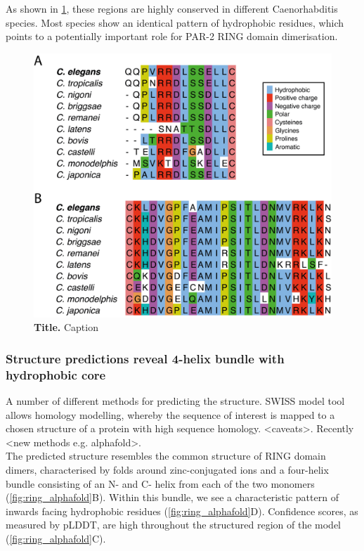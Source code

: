 \documentclass[12pt]{"article"}
\newcommand{\mycaption}[2]{\caption[#1]{\textbf{#1.} #2}}
\begin{document}
As shown in \cref{fig:alignments_par2}, these regions are highly conserved in different Caenorhabditis species. Most species show an identical pattern of hydrophobic residues, which points to a potentially important role for PAR-2 RING domain dimerisation. \\

\begin{figure}[!h]
\includegraphics[scale=1]{alignments_par2}
\setlength{\abovecaptionskip}{20pt}
\centering
\mycaption{Title}{Caption}
\label{fig:alignments_par2}
\end{figure}

\clearpage
\subsubsection{Structure predictions reveal 4-helix bundle with hydrophobic core}

A number of different methods for predicting the structure. SWISS model tool allows homology modelling, whereby the sequence of interest is mapped to a chosen structure of a protein with high sequence homology. <caveats>. Recently <new methods e.g. alphafold>. \citep{Jumper2021} \\

The predicted structure resembles the common structure of RING domain dimers, characterised by folds around zinc-conjugated ions and a four-helix bundle consisting of an N- and C- helix from each of the two monomers (\cref{fig:ring_alphafold}B). Within this bundle, we see a characteristic pattern of inwards facing hydrophobic residues (\cref{fig:ring_alphafold}D). Confidence scores, as measured by pLDDT, are high throughout the structured region of the model (\cref{fig:ring_alphafold}C).\\
\end{document}
